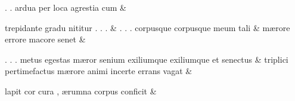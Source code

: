 \documentclass[12pt,onecolumn,twoside,a4paper]{memoir}
\begin{document}
               \begin{pairs}
                  \begin{Leftside}
			\beginnumbering
			\setcounter{stanzaL}{0}
                     
                         \stanza {}.
                              .
                              ardua
                              per
                              loca
                              agrestia
                              cum & 
                     
                              trepidante
                              gradu
                              nititur
                              .
                              .
                              . \&
                         \stanza {}.
                              .
                              .
                              corpusque
                              {corpusque}
                              meum
                              tali & 
                     mærore
                              errore
                              macore
                              senet \&
                         \stanza {}
                     
                              .
                              .
                              .
                              metus
                              egestas
                              mæror
                              senium
                              exiliumque
                              {exiliumque}
                              et
                              senectus \&
                         \stanza {}
                     triplici
                              pertimefactus
                              mærore
                              animi
                              incerte
                              errans
                              vagat \&
                         \stanza {}
                     
                              lapit
                              cor
                              cura
                              ,
                              ærumna
                              corpus
                              conficit \&
                         \stanza {}
                     

\end{Leftside}
\end{pairs}
\end{document}
